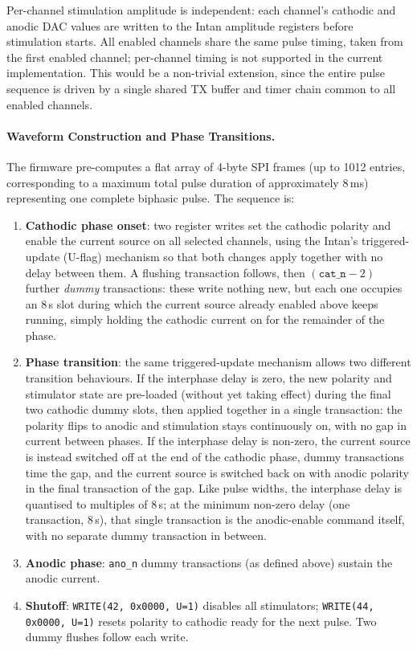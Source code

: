 Per-channel stimulation amplitude is independent: each channel's cathodic and
anodic DAC values are written to the Intan amplitude registers before stimulation
starts. All
enabled channels share the same pulse timing, taken from the first enabled
channel; per-channel timing is not supported in the current implementation. This
would be a non-trivial extension, since the entire pulse sequence is driven by a
single shared TX buffer and timer chain common to all enabled channels.

\paragraph{Waveform Construction and Phase Transitions.}
The firmware pre-computes a flat array of 4-byte SPI
frames (up to 1012 entries, corresponding to a maximum total pulse duration of
approximately 8\,ms) representing one complete biphasic pulse. The sequence is:

\begin{enumerate}
    \item \textbf{Cathodic phase onset}: two register writes set the cathodic
    polarity and enable the current source on all selected channels, using the
    Intan's triggered-update (U-flag) mechanism so that both changes apply
    together with no delay between them. A flushing transaction follows, then
    $(\texttt{cat\_n} - 2)$ further \emph{dummy} transactions: these write nothing
    new, but each one occupies an 8\,\textmu{}s slot during which the current
    source already enabled above keeps running, simply holding the cathodic
    current on for the remainder of the phase.

    \item \textbf{Phase transition}: the same triggered-update mechanism allows
    two different transition behaviours. If the interphase delay is zero, the new
    polarity and stimulator state are pre-loaded (without yet taking effect)
    during the final two cathodic dummy slots, then applied together in a single
    transaction: the polarity flips to anodic and stimulation stays continuously
    on, with no gap in current between phases. If the interphase delay is
    non-zero, the current source is instead switched off at the end of the
    cathodic phase, dummy transactions time the gap, and the current source is
    switched back on with anodic polarity in the final transaction of the gap.
    Like pulse widths, the interphase delay is quantised to multiples of
    8\,\textmu{}s; at the minimum non-zero delay (one transaction, 8\,\textmu{}s),
    that single transaction is the anodic-enable command itself, with no separate
    dummy transaction in between.

    \item \textbf{Anodic phase}: \texttt{ano\_n} dummy transactions (as defined
    above) sustain the anodic current.

    \item \textbf{Shutoff}: \texttt{WRITE(42, 0x0000, U=1)} disables all
    stimulators; \texttt{WRITE(44, 0x0000, U=1)} resets polarity to cathodic
    ready for the next pulse. Two dummy flushes follow each write.
\end{enumerate}

